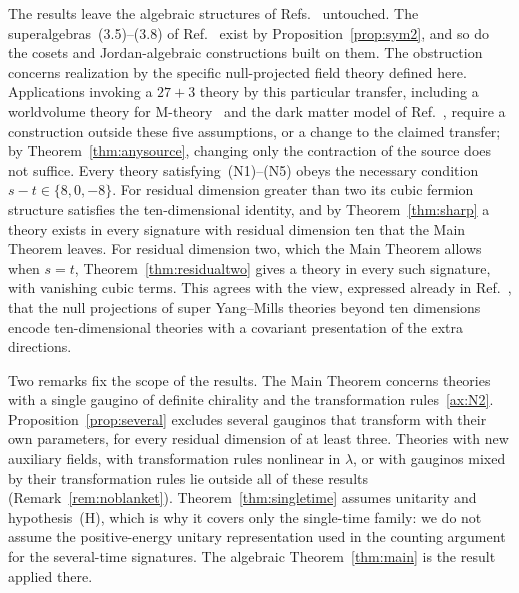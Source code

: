 The results leave the algebraic structures of Refs.~\cite{RiosMarraniChester2019,TruiniMarraniRiosdeGraaf2025,MarraniRiosChester2023} untouched. The superalgebras~(3.5)--(3.8) of Ref.~\cite{RiosMarraniChester2019} exist by Proposition~\ref{prop:sym2}, and so do the cosets and Jordan-algebraic constructions built on them. The obstruction concerns realization by the specific null-projected field theory defined here. Applications invoking a $27+3$ theory by this particular transfer, including a worldvolume theory for M-theory~\cite{RiosMarraniChester2020} and the dark matter model of Ref.~\cite{PaduroiuRiosMarraniChester2021}, require a construction outside these five assumptions, or a change to the claimed transfer; by Theorem~\ref{thm:anysource}, changing only the contraction of the source does not suffice. Every theory satisfying~(N1)--(N5) obeys the necessary condition $s-t\in\{8,0,-8\}$. For residual dimension greater than two its cubic fermion structure satisfies the ten-dimensional identity, and by Theorem~\ref{thm:sharp} a theory exists in every signature with residual dimension ten that the Main Theorem leaves. For residual dimension two, which the Main Theorem allows when $s=t$, Theorem~\ref{thm:residualtwo} gives a theory in every such signature, with vanishing cubic terms. This agrees with the view, expressed already in Ref.~\cite{RudychevSezginSundell1998}, that the null projections of super Yang--Mills theories beyond ten dimensions encode ten-dimensional theories with a covariant presentation of the extra directions.

Two remarks fix the scope of the results. The Main Theorem concerns theories with a single gaugino of definite chirality and the transformation rules~\ref{ax:N2}. Proposition~\ref{prop:several} excludes several gauginos that transform with their own parameters, for every residual dimension of at least three. Theories with new auxiliary fields, with transformation rules nonlinear in $\lambda$, or with gauginos mixed by their transformation rules lie outside all of these results (Remark~\ref{rem:noblanket}). Theorem~\ref{thm:singletime} assumes unitarity and hypothesis~(H), which is why it covers only the single-time family: we do not assume the positive-energy unitary representation used in the counting argument for the several-time signatures. The algebraic Theorem~\ref{thm:main} is the result applied there.

